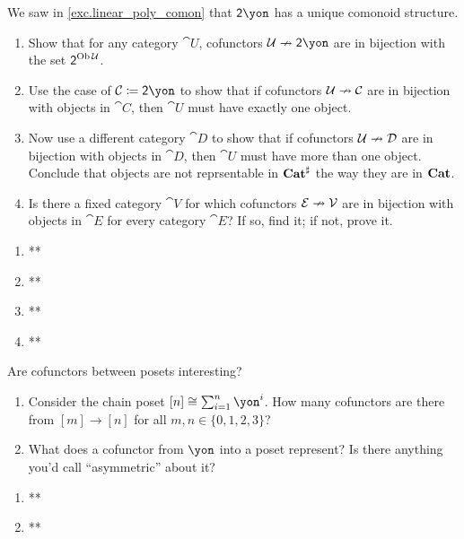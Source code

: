 \documentclass[Book-Poly]{subfiles}
\begin{document}
\begin{exercise}\label{exc.rep_objects}
We saw in \cref{exc.linear_poly_comon} that $\2\yon$ has a unique comonoid structure.
\begin{enumerate}
	\item Show that for any category $\cat{U}$, cofunctors $\cat{U}\cof\2\yon$ are in bijection with the set $\textsf{2}^{\operatorname{Ob}\mathcal{U}}$.
	\item Use the case of $\cat{C}\coloneqq\2\yon$ to show that if cofunctors $\mathcal{U}\nrightarrow\mathcal{C}$ are in bijection with objects in $\cat{C}$, then $\cat{U}$ must have exactly one object.
	\item Now use a different category $\cat{D}$ to show that if cofunctors $\mathcal{U}\nrightarrow\mathcal{D}$ are in bijection with objects in $\cat{D}$, then $\cat{U}$ must have more than one object.
	Conclude that objects are not reprsentable in $\mathbf{Cat}^\sharp$ the way they are in $\mathbf{Cat}$.
	\item Is there a fixed category $\cat{V}$ for which cofunctors $\mathcal{E}\nrightarrow\mathcal{V}$ are in bijection with objects in $\cat{E}$ for every category $\cat{E}$?
	If so, find it; if not, prove it.
\qedhere
\end{enumerate}
\begin{solution}
\begin{enumerate}
    \item **
    \item **
    \item **
    \item **
\end{enumerate}
\end{solution}
\end{exercise}



\begin{exercise}
Are cofunctors between posets interesting?
\begin{enumerate}
	\item Consider the chain poset $[n]\cong\sum_{i=1}^n\yon^i$. How many cofunctors are there from $[m]\to[n]$ for all $m,n\in\{0,1,2,3\}$?
	\item What does a cofunctor from $\yon$ into a poset represent? Is there anything you'd call ``asymmetric'' about it?
\qedhere
\end{enumerate}
\begin{solution}
\begin{enumerate}
    \item **
    \item **
\end{enumerate}
\end{solution}
\end{exercise}
\end{document}
